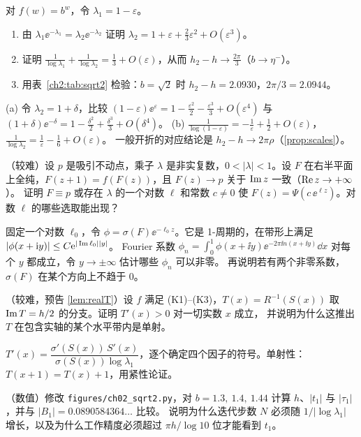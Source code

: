 \begin{exercise}\label{ch2:ex:h2-h}
对 $f(w)=b^w$，令 $\lambda_1=1-\varepsilon$。
\begin{enumerate}[label=(\alph*)]
\item 由 $\lambda_1\ee^{-\lambda_1}=\lambda_2\ee^{-\lambda_2}$ 证明 $\lambda_2=1+\varepsilon+\frac23\varepsilon^2+O(\varepsilon^3)$。
\item 证明 $\frac1{\log\lambda_1}+\frac1{\log\lambda_2}=\frac13+O(\varepsilon)$，从而 $h_2-h\to\frac{2\pi}3$（$b\to\eta^-$）。
\item 用表~\ref{ch2:tab:sqrt2} 检验：$b=\sqrt2$ 时 $h_2-h=2.0930$，$2\pi/3=2.0944$。
\end{enumerate}
\end{exercise}
\begin{hint}
(a) 令 $\lambda_2=1+\delta$，比较 $(1-\varepsilon)\ee^{\varepsilon}=1-\frac{\varepsilon^2}2-\frac{\varepsilon^3}3+O(\varepsilon^4)$ 与 $(1+\delta)\ee^{-\delta}=1-\frac{\delta^2}2+\frac{\delta^3}3+O(\delta^4)$。
(b) $\frac1{\log(1-\varepsilon)}=-\frac1\varepsilon+\frac12+O(\varepsilon)$，$\frac1{\log\lambda_2}=\frac1\varepsilon-\frac16+O(\varepsilon)$。
一般开折的对应结论是 $h_2-h\to2\pi\rho$（\cref{prop:scales}）。
\end{hint}

\begin{exercise}\label{ch2:ex:complex-unique}
（较难）设 $p$ 是吸引不动点，乘子 $\lambda$ 是非实复数，$0<|\lambda|<1$。设 $F$ 在右半平面上全纯，$F(z+1)=f(F(z))$，且 $F(z)\to p$ 关于 $\operatorname{Im} z$ 一致（$\operatorname{Re} z\to+\infty$）。
证明 $F\equiv p$ 或存在 $\lambda$ 的一个对数 $\ell$ 和常数 $c\ne0$ 使 $F(z)=\Psi(c\,\ee^{\ell z})$。对数 $\ell$ 的哪些选取能出现？
\end{exercise}
\begin{hint}
固定一个对数 $\ell_0$，令 $\phi=\sigma(F)\ee^{-\ell_0z}$。它是 1-周期的，在带形上满足 $|\phi(x+\mathrm{i} y)|\le C\mathrm{e}^{|\operatorname{Im}\ell_0||y|}$。
Fourier 系数 $\phi_n=\int_0^1\phi(x+\ii y)\ee^{-2\pi\ii n(x+\ii y)}\dd x$ 对每个 $y$ 都成立，令 $y\to\pm\infty$ 估计哪些 $\phi_n$ 可以非零。
再说明若有两个非零系数，$\sigma(F)$ 在某个方向上不趋于 $0$。
\end{hint}

\begin{exercise}\label{ch2:ex:T-monotone}
（较难，预告 \cref{lem:realT}）设 $f$ 满足 (K1)--(K3)，$T(x)=R^{-1}(S(x))$ 取 $\operatorname{Im} T=h/2$ 的分支。证明 $T'(x)>0$ 对一切实数 $x$ 成立，
并说明为什么这推出 $T$ 在包含实轴的某个水平带内是单射。
\end{exercise}
\begin{hint}
$T'(x)=\dfrac{\sigma'(S(x))\,S'(x)}{\sigma(S(x))\log\lambda_1}$，逐个确定四个因子的符号。单射性：$T(x+1)=T(x)+1$，用紧性论证。
\end{hint}

\begin{exercise}\label{ch2:ex:numerics}
（数值）修改 \texttt{figures/ch02\_sqrt2.py}，对 $b=1.3,\ 1.4,\ 1.44$ 计算 $h$、$|t_1|$ 与 $|\tau_1|$，并与 $|B_1|=0.0890584364\ldots$ 比较。
说明为什么迭代步数 $N$ 必须随 $1/|\log\lambda_1|$ 增长，以及为什么工作精度必须超过 $\pi h/\log10$ 位才能看到 $t_1$。
\end{exercise}
